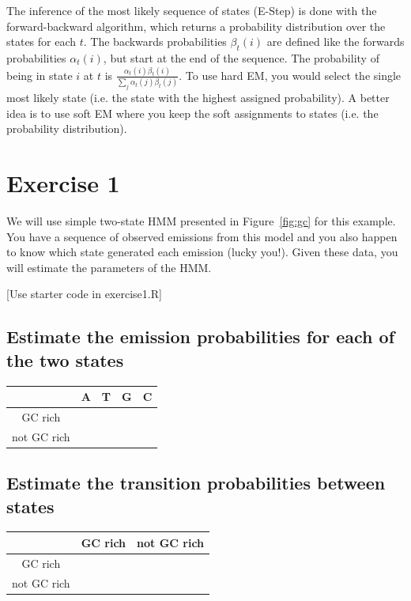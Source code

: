 \documentclass[11pt, oneside]{article}
\begin{document}
The inference of the most likely sequence of states (E-Step) is done with the forward-backward algorithm, which returns a probability distribution over the states for each $t$. The backwards probabilities $\beta_t(i)$ are defined like the forwards probabilities $\alpha_t(i)$, but start at the end of the sequence. The probability of being in state $i$ at $t$ is $\frac{\alpha_t(i)\beta_t(i)}{\sum_j \alpha_t(j)\beta_t(j)}$. To use hard EM, you would select the single most likely state (i.e. the state with the highest assigned probability). A better idea is to use soft EM where you keep the soft assignments to states (i.e. the probability distribution).


\section{Exercise 1}
We will use simple two-state HMM presented in Figure~\ref{fig:gc} for this example.
You have a sequence of observed emissions from this model and you also happen to know which state generated each emission (lucky you!). 
Given these data, you will estimate the parameters of the HMM.

[Use starter code in exercise1.R]

\subsection{Estimate the emission probabilities for each of the two states}
\begin{table}[H]
\centering
\begin{tabular}{|c|c|c|c|c|}
\hline
& A & T & G & C \\\hline
GC rich & & & &  \\\hline
not GC rich & & & & \\\hline
\end{tabular}
\end{table}

\subsection{Estimate the transition probabilities between states}
\begin{table}[H]
\centering
\begin{tabular}{|c|c|c|}
\hline
& GC rich & not GC rich \\\hline
GC rich & &  \\\hline
not GC rich & &  \\\hline
\end{tabular}
\end{table}
\end{document}
